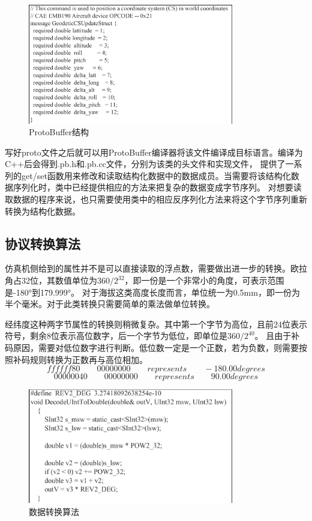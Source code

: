 \begin{figure}[h!]
    \begin{center}
        \includegraphics[width=0.8\textwidth]{pictures/code15.pdf}
        \caption{ProtoBuffer结构}
        \label{pb21}
    \end{center}
\end{figure}
\par
写好proto文件之后就可以用ProtoBuffer编译器将该文件编译成目标语言。编译为C++后会得到.pb.h和.pb.cc文件，分别为该类的头文件和实现文件，
提供了一系列的get/set函数用来修改和读取结构化数据中的数据成员。当需要将该结构化数据序列化时，类中已经提供相应的方法来把复杂的数据变成字节序列。
对想要读取数据的程序来说，也只需要使用类中的相应反序列化方法来将这个字节序列重新转换为结构化数据。
\subsection{协议转换算法}
仿真机侧给到的属性并不是可以直接读取的浮点数，需要做出进一步的转换。欧拉角占32位，其数值单位为$360/2^{32}$，即一份是一个非常小的角度，可表示范围是-180°到179.999°。
对于海拔这类高度长度而言，单位统一为0.5mm，即一份为半个毫米。对于此类转换只需要简单的乘法做单位转换。
\par
经纬度这种两字节属性的转换则稍微复杂。其中第一个字节为高位，且前24位表示符号，剩余8位表示高位数字，后一个字节为低位，即单位是$360/2^{40}$。
且由于补码原因，需要对低位数字进行判断。低位数一定是一个正数，若为负数，则需要按照补码规则转换为正数再与高位相加。
$$ffffff80 \qquad 00000000 \qquad represents \qquad -180.00degrees$$
$$00000040 \qquad 00000000 \qquad represents \qquad 90.00 degrees$$
\begin{figure}[h!]
    \begin{center}
        \includegraphics[width=0.8\textwidth]{pictures/code16.pdf}
        \caption{数据转换算法}
    \end{center}
\end{figure}
